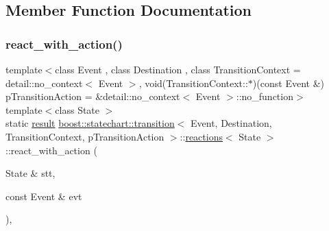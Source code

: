 \subsection{Member Function Documentation}
\mbox{\label{structboost_1_1statechart_1_1transition_1_1reactions_a82b553b236c3003abfea39e2aaf4d179}} 
\subsubsection{\texorpdfstring{react\+\_\+with\+\_\+action()}{react\_with\_action()}}
{\footnotesize\ttfamily template$<$class Event , class Destination , class Transition\+Context  = detail\+::no\+\_\+context$<$ Event $>$, void(\+Transition\+Context\+::$\ast$)(const Event \&) p\+Transition\+Action = \&detail\+::no\+\_\+context$<$ Event $>$\+::no\+\_\+function$>$ \\
template$<$class State $>$ \\
static \mbox{\hyperlink{namespaceboost_1_1statechart_abe807f6598b614d6d87bb951ecd92331}{result}} \mbox{\hyperlink{classboost_1_1statechart_1_1transition}{boost\+::statechart\+::transition}}$<$ Event, Destination, Transition\+Context, p\+Transition\+Action $>$\+::\mbox{\hyperlink{structboost_1_1statechart_1_1transition_1_1reactions}{reactions}}$<$ State $>$\+::react\+\_\+with\+\_\+action (\begin{DoxyParamCaption}\item[{State \&}]{stt,  }\item[{const Event \&}]{evt }\end{DoxyParamCaption})\hspace{0.3cm}{\ttfamily [inline]}, {\ttfamily [static]}}

\mbox{\label{structboost_1_1statechart_1_1transition_1_1reactions_a545ce845f5aea7cbd44dc4740e05b536}} 
